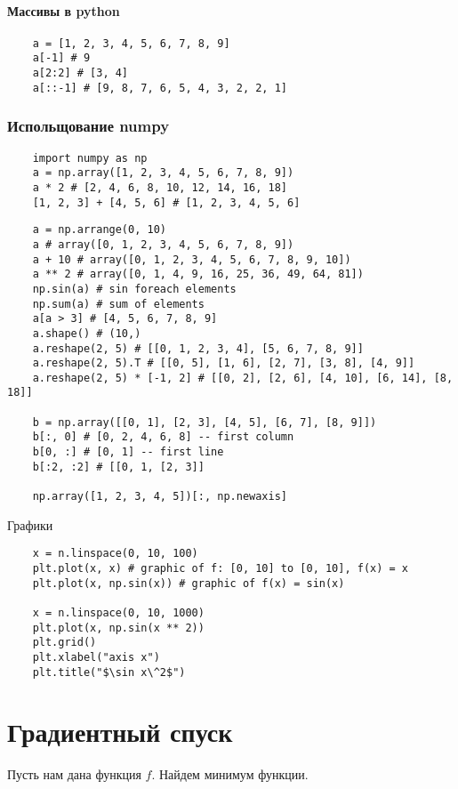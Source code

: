 \subsubsection{Массивы в python}
\begin{lstlisting}
    a = [1, 2, 3, 4, 5, 6, 7, 8, 9]
    a[-1] # 9
    a[2:2] # [3, 4]
    a[::-1] # [9, 8, 7, 6, 5, 4, 3, 2, 2, 1]
\end{lstlisting}

\subsection{Испольщование numpy}
\begin{lstlisting}
    import numpy as np
    a = np.array([1, 2, 3, 4, 5, 6, 7, 8, 9])
    a * 2 # [2, 4, 6, 8, 10, 12, 14, 16, 18]
    [1, 2, 3] + [4, 5, 6] # [1, 2, 3, 4, 5, 6]
\end{lstlisting}

\begin{lstlisting}
    a = np.arrange(0, 10)
    a # array([0, 1, 2, 3, 4, 5, 6, 7, 8, 9])
    a + 10 # array([0, 1, 2, 3, 4, 5, 6, 7, 8, 9, 10])
    a ** 2 # array([0, 1, 4, 9, 16, 25, 36, 49, 64, 81])
    np.sin(a) # sin foreach elements
    np.sum(a) # sum of elements
    a[a > 3] # [4, 5, 6, 7, 8, 9]
    a.shape() # (10,)
    a.reshape(2, 5) # [[0, 1, 2, 3, 4], [5, 6, 7, 8, 9]]
    a.reshape(2, 5).T # [[0, 5], [1, 6], [2, 7], [3, 8], [4, 9]]
    a.reshape(2, 5) * [-1, 2] # [[0, 2], [2, 6], [4, 10], [6, 14], [8, 18]]

    b = np.array([[0, 1], [2, 3], [4, 5], [6, 7], [8, 9]])
    b[:, 0] # [0, 2, 4, 6, 8] -- first column
    b[0, :] # [0, 1] -- first line
    b[:2, :2] # [[0, 1, [2, 3]]

    np.array([1, 2, 3, 4, 5])[:, np.newaxis]
\end{lstlisting}

Графики
\begin{lstlisting}
    x = n.linspace(0, 10, 100)
    plt.plot(x, x) # graphic of f: [0, 10] to [0, 10], f(x) = x
    plt.plot(x, np.sin(x)) # graphic of f(x) = sin(x)

    x = n.linspace(0, 10, 1000)
    plt.plot(x, np.sin(x ** 2))
    plt.grid()
    plt.xlabel("axis x")
    plt.title("$\sin x\^2$")
\end{lstlisting}


\chapter{Градиентный спуск}
Пусть нам дана функция $f$. Найдем минимум функции.

